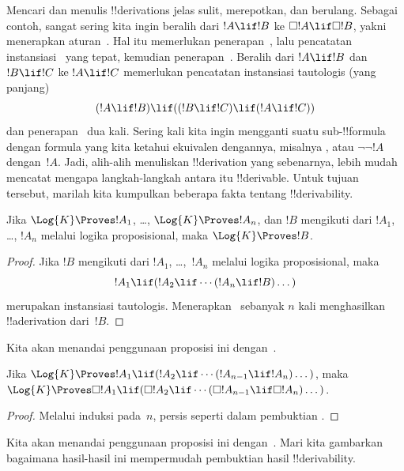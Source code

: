 \documentclass[../../../include/open-logic-section]{subfiles}
\begin{document}


Mencari dan menulis !!{derivation}s jelas sulit, merepotkan, dan berulang.
Sebagai contoh, sangat sering kita ingin beralih dari $!A\lif !B$ ke
$\Box !A\lif\Box !B$, yakni menerapkan aturan~\RK. Hal itu memerlukan
penerapan~\Nec, lalu pencatatan instansiasi~ yang tepat, kemudian
penerapan~\MP. Beralih dari $!A\lif !B$ dan $!B\lif !C$ ke $!A\lif !C$
memerlukan pencatatan instansiasi tautologis (yang panjang)
\[
(!A \lif !B) \lif ((!B \lif !C) \lif (!A \lif !C))
\]
dan penerapan~\MP{} dua kali. Sering kali kita ingin mengganti suatu
sub-!!{formula} dengan formula yang kita ketahui ekuivalen dengannya, misalnya
, atau $\lnot\lnot !A$ dengan~$!A$. Jadi,
alih-alih menuliskan !!{derivation} yang sebenarnya, lebih mudah mencatat
mengapa langkah-langkah antara itu !!{derivable}. Untuk tujuan tersebut,
marilah kita kumpulkan beberapa fakta tentang !!{derivability}.

\begin{prop}
  Jika $\Log{K}\Proves !A_1$, \dots, $\Log{K}\Proves !A_n$, dan $!B$
  mengikuti dari $!A_1$, \dots, $!A_n$ melalui logika proposisional, maka
  $\Log{K}\Proves !B$.
\end{prop}

\begin{proof}
  Jika $!B$ mengikuti dari $!A_1$, \dots,~$!A_n$ melalui logika
  proposisional, maka
  \[
  !A_1 \lif (!A_2 \lif \cdots (!A_n \lif !B)\dots)
  \]
  merupakan instansiasi tautologis. Menerapkan~\MP{} sebanyak $n$ kali
  menghasilkan !!a{derivation} dari~$!B$.
\end{proof}

Kita akan menandai penggunaan proposisi ini dengan~\PL.

\begin{prop}
  Jika $\Log{K}\Proves !A_1\lif(!A_2\lif\cdots(!A_{n-1}\lif
  !A_n)\dots)$, maka $\Log{K}\Proves\Box !A_1\lif(\Box !A_2\lif
  \cdots(\Box !A_{n-1}\lif\Box !A_n)\dots)$.
\end{prop}

\begin{proof}
  Melalui induksi pada~$n$, persis seperti dalam pembuktian
  .
\end{proof}

Kita akan menandai penggunaan proposisi ini dengan~\RK. Mari kita gambarkan
bagaimana hasil-hasil ini mempermudah pembuktian hasil !!{derivability}.
\end{document}
